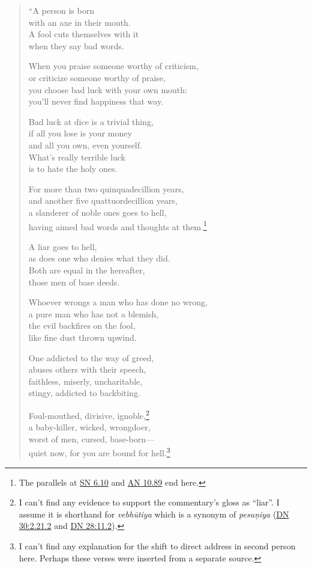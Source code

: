 \documentclass[12pt,openany]{book}%
\begin{document}
\begin{verse}%
“A person is born \\
with an axe in their mouth. \\
A fool cuts themselves with it \\
when they say bad words. 

When you praise someone worthy of criticism, \\
or criticize someone worthy of praise, \\
you choose bad luck with your own mouth: \\
you’ll never find happiness that way. 

Bad luck at dice is a trivial thing, \\
if all you lose is your money \\
and all you own, even yourself. \\
What’s really terrible luck \\
is to hate the holy ones. 

For more than two quinquadecillion years, \\
and another five quattuordecillion years, \\
a slanderer of noble ones goes to hell, \\
having aimed bad words and thoughts at them.\footnote{The parallels at \href{https://suttacentral.net/sn6.10/en/sujato}{SN 6.10} and \href{https://suttacentral.net/an10.89/en/sujato}{AN 10.89} end here. } 

A liar goes to hell, \\
as does one who denies what they did. \\
Both are equal in the hereafter, \\
those men of base deeds. 

Whoever wrongs a man who has done no wrong, \\
a pure man who has not a blemish, \\
the evil backfires on the fool, \\
like fine dust thrown upwind. 

One addicted to the way of greed, \\
abuses others with their speech, \\
faithless, miserly, uncharitable, \\
stingy, addicted to backbiting. 

Foul-mouthed, divisive, ignoble,\footnote{I can’t find any evidence to support the commentary’s gloss as “liar”. I assume it is shorthand for \textit{\textsanskrit{vebhūtiya}} which is a synonym of \textit{\textsanskrit{pesuṇiya}} (\href{https://suttacentral.net/dn30/en/sujato\#2.21.2}{DN 30:2.21.2} and \href{https://suttacentral.net/dn28/en/sujato\#11.2}{DN 28:11.2}). } \\
a baby-killer, wicked, wrongdoer, \\
worst of men, cursed, base-born—\\
quiet now, for you are bound for hell.\footnote{I can’t find any explanation for the shift to direct address in second person here. Perhaps these verses were inserted from a separate source. } 


\end{verse}
\end{document}
